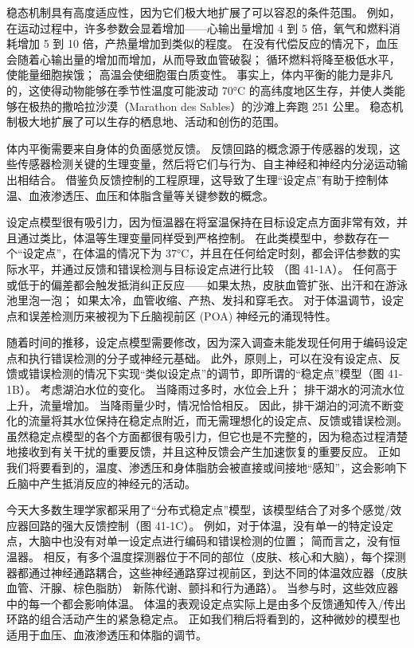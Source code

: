 稳态机制具有高度适应性，因为它们极大地扩展了可以容忍的条件范围。 例如，在运动过程中，许多参数会显着增加——心输出量增加 4 到 5 倍，氧气和燃料消耗增加 5 到 10 倍，产热量增加到类似的程度。 在没有代偿反应的情况下，血压会随着心输出量的增加而增加，从而导致血管破裂； 循环燃料将降至极低水平，使能量细胞挨饿； 高温会使细胞蛋白质变性。 事实上，体内平衡的能力是非凡的，这使得动物能够在季节性温度可能波动 70°C 的高纬度地区生存，并使人类能够在极热的撒哈拉沙漠（Marathon des Sables）的沙滩上奔跑 251 公里。 稳态机制极大地扩展了可以生存的栖息地、活动和创伤的范围。

体内平衡需要来自身体的负面感觉反馈。 反馈回路的概念源于传感器的发现，这些传感器检测关键的生理变量，然后将它们与行为、自主神经和神经内分泌运动输出相结合。 借鉴负反馈控制的工程原理，这导致了生理“设定点”有助于控制体温、血液渗透压、血压和体脂含量等关键参数的概念。

设定点模型很有吸引力，因为恒温器在将室温保持在目标设定点方面非常有效，并且通过类比，体温等生理变量同样受到严格控制。
在此类模型中，参数存在一个“设定点”，在体温的情况下为 37°C，并且在任何给定时刻，都会评估参数的实际水平，并通过反馈和错误检测与目标设定点进行比较 （图 41-1A）。 
任何高于或低于的偏差都会触发抵消纠正反应——如果太热，皮肤血管扩张、出汗和在游泳池里泡一泡； 如果太冷，血管收缩、产热、发抖和穿毛衣。 对于体温调节，设定点和误差检测历来被视为下丘脑视前区 (POA) 神经元的涌现特性。

随着时间的推移，设定点模型需要修改，因为深入调查未能发现任何用于编码设定点和执行错误检测的分子或神经元基础。 此外，原则上，可以在没有设定点、反馈或错误检测的情况下实现“类似设定点”的调节，即所谓的“稳定点”模型（图 41-1B）。 考虑湖泊水位的变化。 当降雨过多时，水位会上升； 排干湖水的河流水位上升，流量增加。 当降雨量少时，情况恰恰相反。 因此，排干湖泊的河流不断变化的流量将其水位保持在稳定点附近，而无需理想化的设定点、反馈或错误检测。 虽然稳定点模型的各个方面都很有吸引力，但它也是不完整的，因为稳态过程清楚地接收到有关干扰的重要反馈，并且这种反馈会产生加速恢复的重要反应。 正如我们将要看到的，温度、渗透压和身体脂肪会被直接或间接地“感知”，这会影响下丘脑中产生抵消反应的神经元的活动。

今天大多数生理学家都采用了“分布式稳定点”模型，该模型结合了对多个感觉/效应器回路的强大反馈控制（图 41-1C）。 例如，对于体温，没有单一的特定设定点，大脑中也没有对单一设定点进行编码和错误检测的位置； 简而言之，没有恒温器。 相反，有多个温度探测器位于不同的部位（皮肤、核心和大脑），每个探测器都通过神经通路耦合，这些神经通路穿过视前区，到达不同的体温效应器（皮肤血管、汗腺、棕色脂肪） 新陈代谢、颤抖和行为通路）。 当参与时，这些效应器中的每一个都会影响体温。 体温的表观设定点实际上是由多个反馈通知传入/传出环路的组合活动产生的紧急稳定点。 正如我们稍后将看到的，这种微妙的模型也适用于血压、血液渗透压和体脂的调节。

